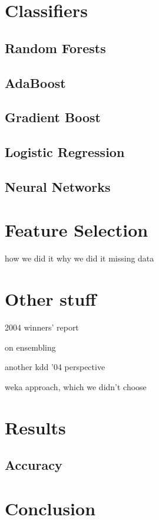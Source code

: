 \documentclass{article}
\begin{document}

\section{Classifiers}
\subsection{Random Forests}

\subsection{AdaBoost}

\subsection{Gradient Boost}

\subsection{Logistic Regression}

\subsection{Neural Networks}



\section{Feature Selection}
how we did it
why we did it
  missing data


\section{Other stuff}
2004 winners' report \cite{vogel2004anti}

on ensembling \cite{caruana2004ensemble}

another kdd '04 perspective \cite{caruana2004kdd}

weka approach, which we didn't choose \cite{pfahringer2004weka}


\section{Results}
\subsection{Accuracy}


\section{Conclusion}




\end{document}
